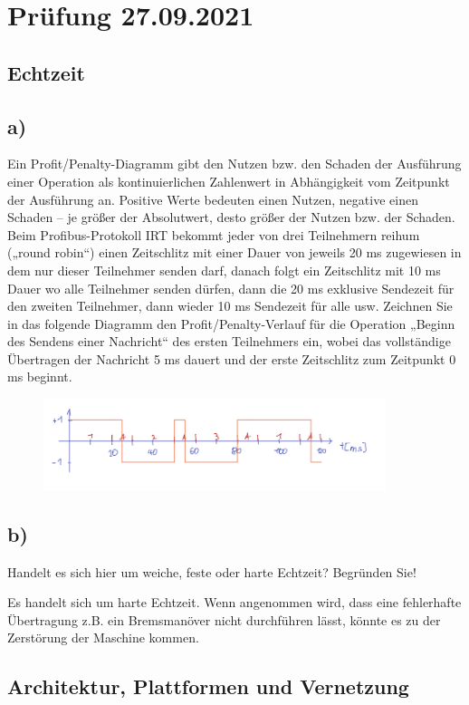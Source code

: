 \section{Prüfung 27.09.2021}
\subsection{Echtzeit}
\subsection{a)}
Ein Profit/Penalty-Diagramm gibt den Nutzen bzw. den Schaden der Ausführung einer Operation als
kontinuierlichen Zahlenwert in Abhängigkeit vom Zeitpunkt der Ausführung an. Positive Werte
bedeuten einen Nutzen, negative einen Schaden – je größer der Absolutwert, desto größer der Nutzen
bzw. der Schaden.
Beim Profibus-Protokoll IRT bekommt jeder von drei Teilnehmern reihum („round robin“) einen
Zeitschlitz mit einer Dauer von jeweils 20 ms zugewiesen in dem nur dieser Teilnehmer senden darf,
danach folgt ein Zeitschlitz mit 10 ms Dauer wo alle Teilnehmer senden dürfen, dann die 20 ms
exklusive Sendezeit für den zweiten Teilnehmer, dann wieder 10 ms Sendezeit für alle usw. Zeichnen
Sie in das folgende Diagramm den Profit/Penalty-Verlauf für die Operation „Beginn des Sendens einer
Nachricht“ des ersten Teilnehmers ein, wobei das vollständige Übertragen der Nachricht 5 ms dauert
und der erste Zeitschlitz zum Zeitpunkt 0 ms beginnt.
\begin{figure}[H]
  \includegraphics[width=10cm]{images/KA270921/1a.PNG}
  \centering
\end{figure}

\subsection{b)}
Handelt es sich hier um weiche, feste oder harte Echtzeit? Begründen Sie!

Es handelt sich um harte Echtzeit. Wenn angenommen wird, dass eine fehlerhafte Übertragung z.B. ein Bremsmanöver
nicht durchführen lässt, könnte es zu der Zerstörung der Maschine kommen.

\subsection{Architektur, Plattformen und Vernetzung}
